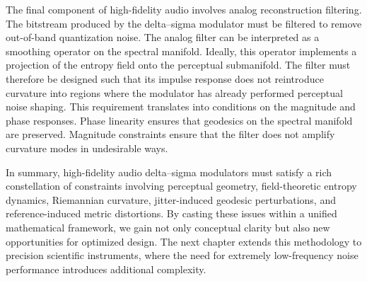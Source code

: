 The final component of high-fidelity audio involves analog reconstruction filtering. The bitstream produced by the delta--sigma modulator must be filtered to remove out-of-band quantization noise. The analog filter can be interpreted as a smoothing operator on the spectral manifold. Ideally, this operator implements a projection of the entropy field onto the perceptual submanifold. The filter must therefore be designed such that its impulse response does not reintroduce curvature into regions where the modulator has already performed perceptual noise shaping. This requirement translates into conditions on the magnitude and phase responses. Phase linearity ensures that geodesics on the spectral manifold are preserved. Magnitude constraints ensure that the filter does not amplify curvature modes in undesirable ways.

In summary, high-fidelity audio delta--sigma modulators must satisfy a rich constellation of constraints involving perceptual geometry, field-theoretic entropy dynamics, Riemannian curvature, jitter-induced geodesic perturbations, and reference-induced metric distortions. By casting these issues within a unified mathematical framework, we gain not only conceptual clarity but also new opportunities for optimized design. The next chapter extends this methodology to precision scientific instruments, where the need for extremely low-frequency noise performance introduces additional complexity.


